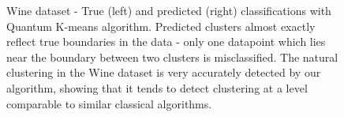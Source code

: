 \documentclass[twocolumn, english]{revtex4-2}
\begin{document}
\begin{figure}
\caption{Wine dataset - True (left) and predicted (right) classifications with Quantum K-means algorithm. Predicted clusters almost exactly reflect true boundaries in the data - only one datapoint which lies near the boundary between two clusters is misclassified. The natural clustering in the Wine dataset is very accurately detected by our algorithm, showing that it tends to detect clustering at a level comparable to similar classical algorithms.}
\end{figure}
\end{document}
